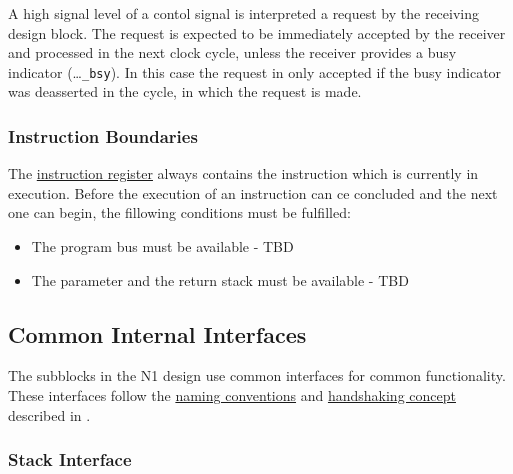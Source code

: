 A high signal level of a contol signal is interpreted a request by the receiving design block.
The request is expected to be immediately accepted by the receiver and processed in the next clock cycle,
unless the receiver provides a busy indicator (\dots\texttt{\_bsy}).
In this case the request in only accepted if the busy indicator was deasserted in the cycle, in which the request is made.

\subsubsection{Instruction Boundaries}
\label{architecture:principles:ibounds}

The \hyperref[architecture:comp:ir]{instruction register} always contains the instruction which is currently in execution.
Before the execution of an instruction can ce concluded and the next one can begin, the fillowing conditions must be fulfilled:
\begin{itemize}

\item   
The program bus must be available - TBD
  
\item   
The parameter and the return stack must be available - TBD
  
\end{itemize}

\subsection{Common Internal Interfaces}
\label{architecture:interfaces}

The subblocks in the N1 design use common interfaces for common functionality. These interfaces follow the
\hyperref[architecture:principles:naming]{naming conventions} and \hyperref[architecture:principles:handshakes]{handshaking concept} 
described in .

\subsubsection{Stack Interface}
\label{architecture:interfaces:stack}

